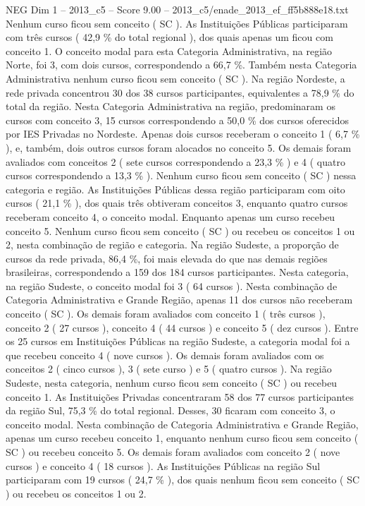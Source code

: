 \begin{textsample}{NEG Dim 1 – 2013\_c5 – Score 9.00 – 2013\_c5/enade\_2013\_ef\_ff5b888e18.txt}
Nenhum curso ficou sem conceito ( SC ).
As Instituições Públicas participaram com três cursos ( 42,9 \% do total regional ), dos quais apenas um ficou com conceito 1.
O conceito modal para esta Categoria Administrativa, na região Norte, foi 3, com dois cursos, correspondendo a 66,7 \%.
Também nesta Categoria Administrativa nenhum curso ficou sem conceito ( SC ).
Na região Nordeste, a rede privada concentrou 30 dos 38 cursos participantes, equivalentes a 78,9 \% do total da região.
Nesta Categoria Administrativa na região, predominaram os cursos com conceito 3, 15 cursos correspondendo a 50,0 \% dos cursos oferecidos por IES Privadas no Nordeste.
Apenas dois cursos receberam o conceito 1 ( 6,7 \% ), e, também, dois outros cursos foram alocados no conceito 5.
Os demais foram avaliados com conceitos 2 ( sete cursos correspondendo a 23,3 \% ) e 4 ( quatro cursos correspondendo a 13,3 \% ).
Nenhum curso ficou sem conceito ( SC ) nessa categoria e região.
As Instituições Públicas dessa região participaram com oito cursos ( 21,1 \% ), dos quais três obtiveram conceitos 3, enquanto quatro cursos receberam conceito 4, o conceito modal.
Enquanto apenas um curso recebeu conceito 5.
Nenhum curso ficou sem conceito ( SC ) ou recebeu os conceitos 1 ou 2, nesta combinação de região e categoria.
Na região Sudeste, a proporção de cursos da rede privada, 86,4 \%, foi mais elevada do que nas demais regiões brasileiras, correspondendo a 159 dos 184 cursos participantes.
Nesta categoria, na região Sudeste, o conceito modal foi 3 ( 64 cursos ).
Nesta combinação de Categoria Administrativa e Grande Região, apenas 11 dos cursos não receberam conceito ( SC ).
Os demais foram avaliados com conceito 1 ( três cursos ), conceito 2 ( 27 cursos ), conceito 4 ( 44 cursos ) e conceito 5 ( dez cursos ).
Entre os 25 cursos em Instituições Públicas na região Sudeste, a categoria modal foi a que recebeu conceito 4 ( nove cursos ).
Os demais foram avaliados com os conceitos 2 ( cinco cursos ), 3 ( sete curso ) e 5 ( quatro cursos ).
Na região Sudeste, nesta categoria, nenhum curso ficou sem conceito ( SC ) ou recebeu conceito 1.
As Instituições Privadas concentraram 58 dos 77 cursos participantes da região Sul, 75,3 \% do total regional.
Desses, 30 ficaram com conceito 3, o conceito modal.
Nesta combinação de Categoria Administrativa e Grande Região, apenas um curso recebeu conceito 1, enquanto nenhum curso ficou sem conceito ( SC ) ou recebeu conceito 5.
Os demais foram avaliados com conceito 2 ( nove cursos ) e conceito 4 ( 18 cursos ).
As Instituições Públicas na região Sul participaram com 19 cursos ( 24,7 \% ), dos quais nenhum ficou sem conceito ( SC ) ou recebeu os conceitos 1 ou 2.

\end{textsample}
